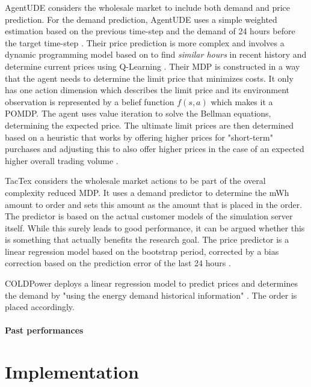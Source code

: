 AgentUDE considers the wholesale market to include both demand and price prediction. For the demand prediction, AgentUDE
uses a simple weighted estimation based on the previous time-step and the demand of 24 hours before the target time-step
\cite[]{ozdemir2015winner}. Their price prediction is more complex and involves a dynamic programming model based on
\cite[]{tesauro2002strategic} to find \emph{similar hours} in recent history and determine current prices using
Q-Learning \cite[]{ozdemir2017strategy}. Their \ac{MDP} is constructed in a way that the agent needs to determine the
limit price that minimizes costs. It only has one action dimension which describes the limit price and its environment
observation is represented by a belief function $f(s,a)$ which makes it a \ac{POMDP}. The agent uses value iteration to
solve the Bellman equations, determining the expected price. The ultimate limit prices are then determined based on a
heuristic that works by offering higher prices for "short-term" purchases and adjusting this to also offer higher prices
in the case of an expected higher overall trading volume \cite[]{ozdemir2017strategy}. 

TacTex considers the wholesale market actions to be part of the overal complexity reduced \ac{MDP}. It uses a demand
predictor to determine the \ac{mWh} amount to order and sets this amount as the amount that is placed in the order. The
predictor is based on the actual customer models of the simulation server itself. While this surely leads to good
performance, it can be argued whether this is something that actually benefits the research goal. The price predictor is
a linear regression model based on the bootstrap period, corrected by a bias correction based on the prediction error of
the last 24 hours \cite[]{tactexurieli2016mdp}.

COLDPower deploys a linear regression model to predict prices and determines the demand by "using the energy demand
historical information" \cite[]{cuevas2015distributed}. The order is placed accordingly. 


\subsubsection{Past performances}%
\label{ssub:past_performances}

\chapter{Implementation}
\label{cha:implementation}

